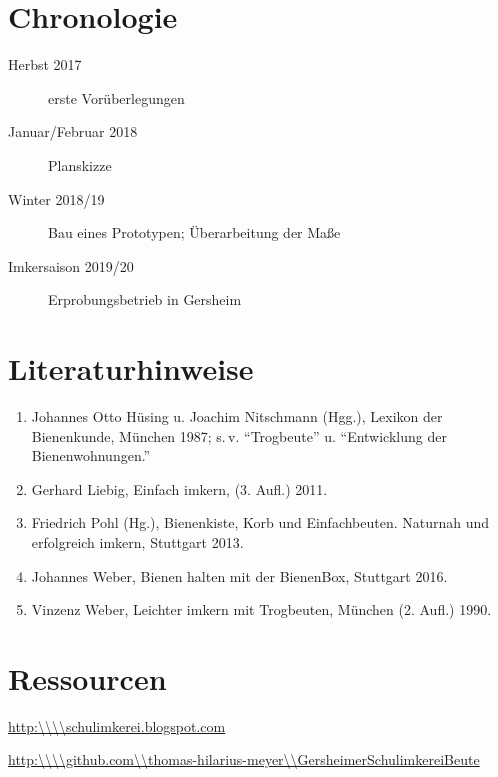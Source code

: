 \documentclass[12pt,a4paper,ngerman]{scrartcl}
\begin{document}
\section{Chronologie}

\begin{description}
\item[Herbst 2017] erste Vorüberlegungen
\item[Januar/Februar 2018] Planskizze
\item[Winter 2018/19] Bau eines Prototypen; Überarbeitung der Maße
\item[Imkersaison 2019/20] Erprobungsbetrieb in Gersheim
\end{description}


\section{Literaturhinweise}

\begin{enumerate}
\item Johannes Otto Hüsing u. Joachim Nitschmann (Hgg.), Lexikon der Bienenkunde, München 1987; s.\,v.
  \enquote{Trogbeute} u.
  \enquote{Entwicklung der Bienenwohnungen.}
\item Gerhard Liebig, Einfach imkern, (3. Aufl.) 2011.
\item Friedrich Pohl (Hg.), Bienenkiste, Korb und Einfachbeuten. Naturnah und erfolgreich imkern, Stuttgart 2013.
\item Johannes Weber, Bienen halten mit der BienenBox, Stuttgart 2016.
\item Vinzenz Weber, Leichter imkern mit Trogbeuten, München (2. Aufl.) 1990.
\end{enumerate}


\section{Ressourcen}

\url{http:\\\\schulimkerei.blogspot.com}

\url{http:\\\\github.com\\thomas-hilarius-meyer\\GersheimerSchulimkereiBeute}
\end{document}
